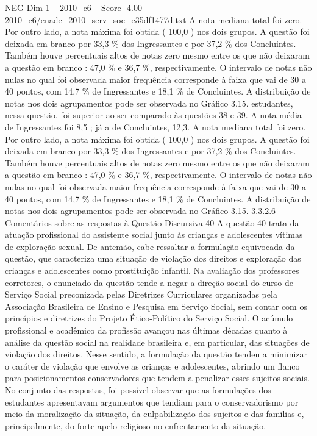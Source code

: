 \begin{textsample}{NEG Dim 1 – 2010\_c6 – Score -4.00 – 2010\_c6/enade\_2010\_serv\_soc\_e35df1477d.txt}
A nota mediana total foi zero.
Por outro lado, a nota máxima foi obtida ( 100,0 ) nos dois grupos.
A questão foi deixada em branco por 33,3 \% dos Ingressantes e por 37,2 \% dos Concluintes.
Também houve percentuais altos de notas zero mesmo entre os que não deixaram a questão em branco : 47,0 \% e 36,7 \%, respectivamente.
O intervalo de notas não nulas no qual foi observada maior frequência corresponde à faixa que vai de 30 a 40 pontos, com 14,7 \% de Ingressantes e 18,1 \% de Concluintes.
A distribuição de notas nos dois agrupamentos pode ser observada no Gráfico 3.15. estudantes, nessa questão, foi superior ao ser comparado às questões 38 e 39.
A nota média de Ingressantes foi 8,5 ; já a de Concluintes, 12,3.
A nota mediana total foi zero.
Por outro lado, a nota máxima foi obtida ( 100,0 ) nos dois grupos.
A questão foi deixada em branco por 33,3 \% dos Ingressantes e por 37,2 \% dos Concluintes.
Também houve percentuais altos de notas zero mesmo entre os que não deixaram a questão em branco : 47,0 \% e 36,7 \%, respectivamente.
O intervalo de notas não nulas no qual foi observada maior frequência corresponde à faixa que vai de 30 a 40 pontos, com 14,7 \% de Ingressantes e 18,1 \% de Concluintes.
A distribuição de notas nos dois agrupamentos pode ser observada no Gráfico 3.15. 3.3.2.6 Comentários sobre as respostas à Questão Discursiva 40 A questão 40 trata da atuação profissional do assistente social junto às crianças e adolescentes vítimas de exploração sexual.
De antemão, cabe ressaltar a formulação equivocada da questão, que caracteriza uma situação de violação dos direitos e exploração das crianças e adolescentes como prostituição infantil.
Na avaliação dos professores corretores, o enunciado da questão tende a negar a direção social do curso de Serviço Social preconizada pelas Diretrizes Curriculares organizadas pela Associação Brasileira de Ensino e Pesquisa em Serviço Social, sem contar com os princípios e diretrizes do Projeto Ético-Político do Serviço Social.
O acúmulo profissional e acadêmico da profissão avançou nas últimas décadas quanto à análise da questão social na realidade brasileira e, em particular, das situações de violação dos direitos.
Nesse sentido, a formulação da questão tendeu a minimizar o caráter de violação que envolve as crianças e adolescentes, abrindo um flanco para posicionamentos conservadores que tendem a penalizar esses sujeitos sociais.
No conjunto das respostas, foi possível observar que as formulações dos estudantes apresentavam argumentos que tendiam para o conservadorismo por meio da moralização da situação, da culpabilização dos sujeitos e das famílias e, principalmente, do forte apelo religioso no enfrentamento da situação.

\end{textsample}
